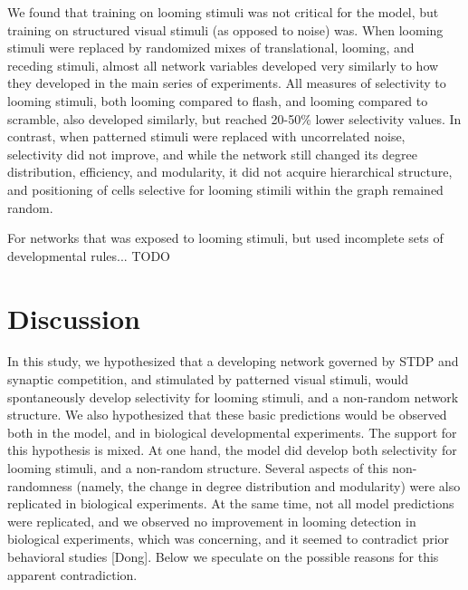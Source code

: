 \documentclass{article}
\begin{document}
We found that training on looming stimuli was not critical for the model, but training on structured visual stimuli (as opposed to noise) was. When looming stimuli were replaced by randomized mixes of translational, looming, and receding stimuli, almost all network variables developed very similarly to how they developed in the main series of experiments. All measures of selectivity to looming stimuli, both looming compared to flash, and looming compared to scramble, also developed similarly, but reached 20-50\% lower selectivity values. In contrast, when patterned stimuli were replaced with uncorrelated noise, selectivity did not improve, and while the network still changed its degree distribution, efficiency, and modularity, it did not acquire hierarchical structure, and positioning of cells selective for looming stimili within the graph remained random.

For networks that was exposed to looming stimuli, but used incomplete sets of developmental rules... TODO

\section*{Discussion}

In this study, we hypothesized that a developing network governed by STDP and synaptic competition, and stimulated by patterned visual stimuli, would spontaneously develop selectivity for looming stimuli, and a non-random network structure. We also hypothesized that these basic predictions would be observed both in the model, and in biological developmental experiments. The support for this hypothesis is mixed. At one hand, the model did develop both selectivity for looming stimuli, and a non-random structure. Several aspects of this non-randomness (namely, the change in degree distribution and modularity) were also replicated in biological experiments. At the same time, not all model predictions were replicated, and we observed no improvement in looming detection in biological experiments, which was concerning, and it seemed to contradict prior behavioral studies [Dong]. Below we speculate on the possible reasons for this apparent contradiction.
\end{document}
